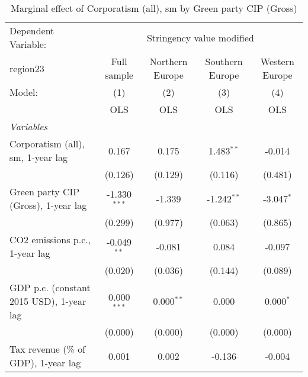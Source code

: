 
\begin{table}[htbp]
   \caption{Marginal effect of Corporatism (all), sm by Green party CIP (Gross)}
   \centering
   \begin{tabular}{lcccc}
      \toprule
      Dependent Variable: & \multicolumn{4}{c}{Stringency value modified}\\
      region23                                                                & Full sample    & Northern Europe & Southern Europe & Western Europe \\   
      Model:                                                                  & (1)            & (2)             & (3)             & (4)\\  
                                                                              &  OLS           & OLS             & OLS             & OLS\\  
      \midrule
      \emph{Variables}\\
      Corporatism (all), sm, 1-year lag                                       & 0.167          & 0.175           & 1.483$^{**}$    & -0.014\\   
                                                                              & (0.126)        & (0.129)         & (0.116)         & (0.481)\\   
      Green party CIP (Gross), 1-year lag                                     & -1.330$^{***}$ & -1.339          & -1.242$^{**}$   & -3.047$^{*}$\\   
                                                                              & (0.299)        & (0.977)         & (0.063)         & (0.865)\\   
      CO2 emissions p.c., 1-year lag                                          & -0.049$^{**}$  & -0.081          & 0.084           & -0.097\\   
                                                                              & (0.020)        & (0.036)         & (0.144)         & (0.089)\\   
      GDP p.c. (constant 2015 USD), 1-year lag                                & 0.000$^{***}$  & 0.000$^{**}$    & 0.000           & 0.000$^{*}$\\   
                                                                              & (0.000)        & (0.000)         & (0.000)         & (0.000)\\   
      Tax revenue (\% of GDP), 1-year lag                                     & 0.001          & 0.002           & -0.136          & -0.004\\   

\end{tabular}
\end{table}
